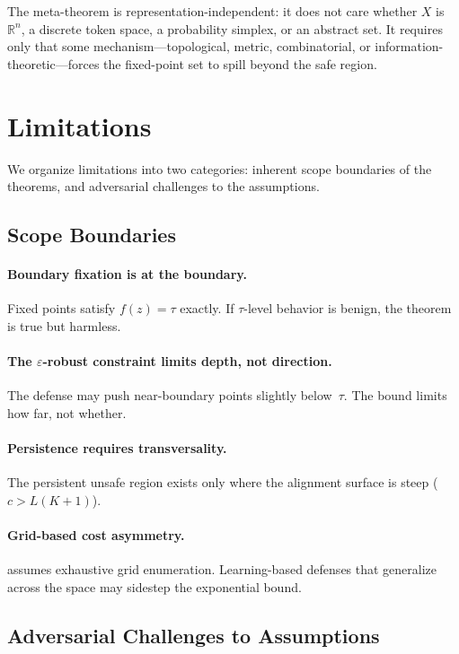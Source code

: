 \documentclass[11pt]{article}
\newcommand{\R}{\mathbb{R}}
\begin{document}
The meta-theorem is representation-independent: it does not care whether
$X$ is $\R^n$, a discrete token space, a probability simplex, or an
abstract set. It requires only that some mechanism---topological,
metric, combinatorial, or information-theoretic---forces the
fixed-point set to spill beyond the safe region.


\section{Limitations}
\label{sec:limitations}

We organize limitations into two categories: inherent scope boundaries
of the theorems, and adversarial challenges to the assumptions.

\subsection{Scope Boundaries}

\paragraph{Boundary fixation is at the boundary.}
Fixed points satisfy $f(z) = \tau$ exactly. If $\tau$-level behavior
is benign, the theorem is true but harmless.

\paragraph{The $\varepsilon$-robust constraint limits depth, not direction.}
The defense may push near-boundary points slightly below~$\tau$. The
bound limits how far, not whether.

\paragraph{Persistence requires transversality.}
The persistent unsafe region exists only where the alignment surface
is steep ($c > L(K+1)$).

\paragraph{Grid-based cost asymmetry.}
 assumes exhaustive grid enumeration. Learning-based
defenses that generalize across the space may sidestep the exponential
bound.

\subsection{Adversarial Challenges to Assumptions}
\end{document}
